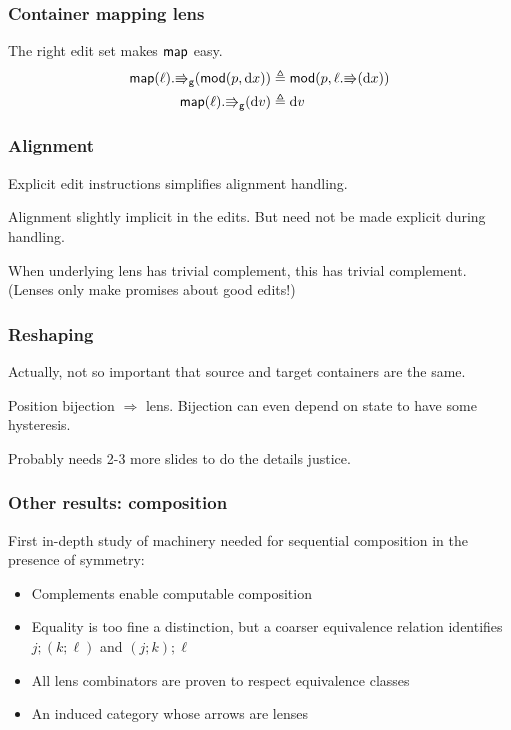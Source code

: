 \documentclass[table]{beamer}
\begin{document}
\begin{frame}
    \frametitle{Container mapping lens}
    The right edit set makes $\mathsf{map}$ easy.
    \begin{align*}
        \mathsf{map}(\ell).\mathord{\Rrightarrow}_{\mathsf{g}}(\mathsf{mod}(p,\textrm{d} x))
            &\triangleq \mathsf{mod}(p,\ell.\mathord{\Rrightarrow}(\textrm{d} x)) \\
        \mathsf{map}(\ell).\mathord{\Rrightarrow}_{\mathsf{g}}(\textrm{d} v) &\triangleq \textrm{d} v
    \end{align*}

\end{frame}

\begin{frame}
    \frametitle{Alignment}
    Explicit edit instructions simplifies alignment handling.

    Alignment slightly implicit in the edits. But need not be made explicit
    during handling.

    When underlying lens has trivial complement, this has trivial
    complement. (Lenses only make promises about good edits!)
\end{frame}

\begin{frame}
    \frametitle{Reshaping}
    Actually, not so important that source and target containers are the
    same.

    Position bijection $\Rightarrow$ lens. Bijection can even depend on
    state to have some hysteresis.

    Probably needs 2-3 more slides to do the details justice.
\end{frame}

\begin{frame}
    \frametitle{Other results: composition}
    First in-depth study of machinery needed for sequential composition in
    the presence of symmetry:
    \begin{itemize}
        \item Complements enable computable composition
        \item Equality is too fine a distinction, but a coarser equivalence
            relation identifies $j;(k;\ell)$ and $(j;k);\ell$
        \item All lens combinators are proven to respect equivalence classes
        \item An induced category whose arrows are lenses
    \end{itemize}
\end{frame}
\end{document}
